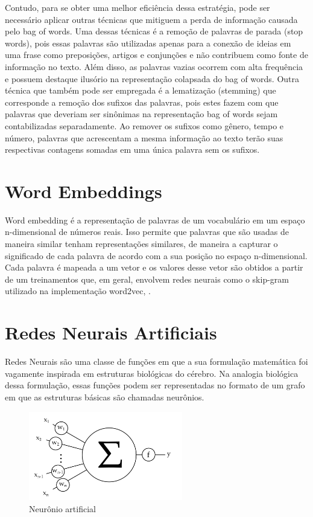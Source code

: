 Contudo, para se obter uma melhor eficiência dessa estratégia, pode ser necessário aplicar outras técnicas que mitiguem a perda de informação causada pelo bag of words. Uma dessas técnicas é a remoção de palavras de parada (stop words), pois essas palavras são utilizadas apenas para a conexão de ideias em uma frase como preposições, artigos e conjunções e não contribuem como fonte de informação no texto. Além disso, as palavras vazias ocorrem com alta frequência e possuem destaque ilusório na representação colapsada do bag of words. Outra técnica que também pode ser empregada é a lematização (stemming) que corresponde a remoção dos sufixos das palavras, pois estes fazem com que palavras que deveriam ser sinônimas na representação bag of words sejam contabilizadas separadamente. Ao remover os sufixos como gênero, tempo e número, palavras que acrescentam a mesma informação ao texto terão suas respectivas contagens somadas em uma única palavra sem os sufixos.

\section{Word Embeddings}

Word embedding é a representação de palavras de um vocabulário em um espaço n-dimensional de números reais. Isso permite que palavras que são usadas de maneira similar tenham representações similares, de maneira a capturar o significado de cada palavra de acordo com a sua posição no espaço n-dimensional. Cada palavra é mapeada a um vetor e os valores desse vetor são obtidos a partir de um treinamentos que, em geral, envolvem redes neurais como o skip-gram utilizado na implementação word2vec, \cite{DBLP:journals/corr/MikolovSCCD13}.

\section{Redes Neurais Artificiais}

Redes Neurais são uma classe de funções em que a sua formulação matemática foi vagamente inspirada em estruturas biológicas do cérebro. Na analogia biológica dessa formulação, essas funções podem ser representadas no formato de um grafo em que as estruturas básicas são chamadas neurônios.

\begin{figure}[!ht]
	\centering
	\includegraphics[width=0.6\textwidth]{figures/neuron.png}
	\caption{Neurônio artificial}
	\label{fig:neuron}
\end{figure}

